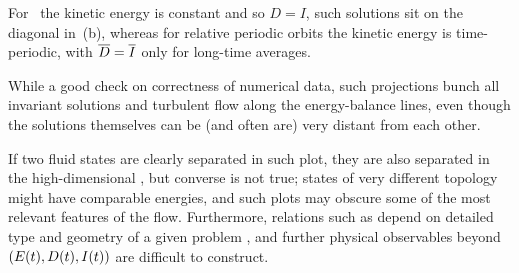 For \reqva\ the kinetic
energy is constant and so $D=I$, such solutions sit on the diagonal in
\,(b), whereas for relative periodic orbits the kinetic
energy is time-periodic, with $\overline{D}=\overline{I}$ only for
long-time averages.

While a good check on correctness of numerical data, such projections
bunch all invariant solutions and turbulent flow along the energy-balance
lines, even though the solutions themselves can be (and often are) very
distant from each other.

If two fluid states are clearly separated in
such plot, they are also separated in the high-dimensional \statesp, but
converse is not true; states of very different topology might have
comparable energies, and such plots may obscure some of the most relevant
features of the flow. Furthermore, relations such as 
depend on detailed type and geometry of a given problem
, and further physical observables beyond
$(E(t),D(t),I(t))$ are difficult to construct.


